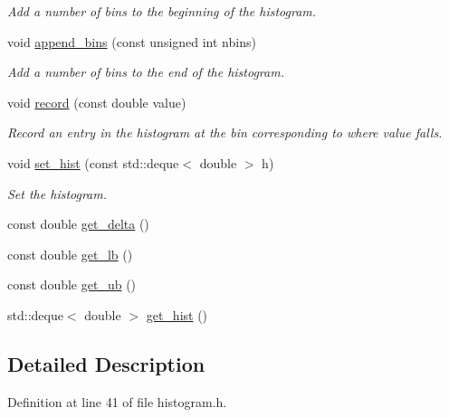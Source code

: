 \begin{DoxyCompactItemize}
\begin{DoxyCompactList}\small\item\em Add a number of bins to the beginning of the histogram. \end{DoxyCompactList}\item 
void \hyperlink{classdynamic__one__dim__histogram_a6fa516279d227e363aa90baf29f8a181}{append\-\_\-bins} (const unsigned int nbins)
\begin{DoxyCompactList}\small\item\em Add a number of bins to the end of the histogram. \end{DoxyCompactList}\item 
void \hyperlink{classdynamic__one__dim__histogram_a2ae28c147c2dfc624ece9102603dd667}{record} (const double value)
\begin{DoxyCompactList}\small\item\em Record an entry in the histogram at the bin corresponding to where value falls. \end{DoxyCompactList}\item 
void \hyperlink{classdynamic__one__dim__histogram_a6fe82d8d8f463c6ca684bf1fead1d5c3}{set\-\_\-hist} (const std\-::deque$<$ double $>$ h)
\begin{DoxyCompactList}\small\item\em Set the histogram. \end{DoxyCompactList}\item 
const double \hyperlink{classdynamic__one__dim__histogram_a36567635816c1d33b8fb6f14ac50d575}{get\-\_\-delta} ()
\item 
const double \hyperlink{classdynamic__one__dim__histogram_a3849f19cd0c77e153cf32b0acefacc4d}{get\-\_\-lb} ()
\item 
const double \hyperlink{classdynamic__one__dim__histogram_a50871ffa445bce5f4443770a18db84aa}{get\-\_\-ub} ()
\item 
std\-::deque$<$ double $>$ \hyperlink{classdynamic__one__dim__histogram_ac3903fa9339e78a5b9abe908af279b0a}{get\-\_\-hist} ()
\end{DoxyCompactItemize}


\subsection{Detailed Description}


Definition at line 41 of file histogram.\-h.



